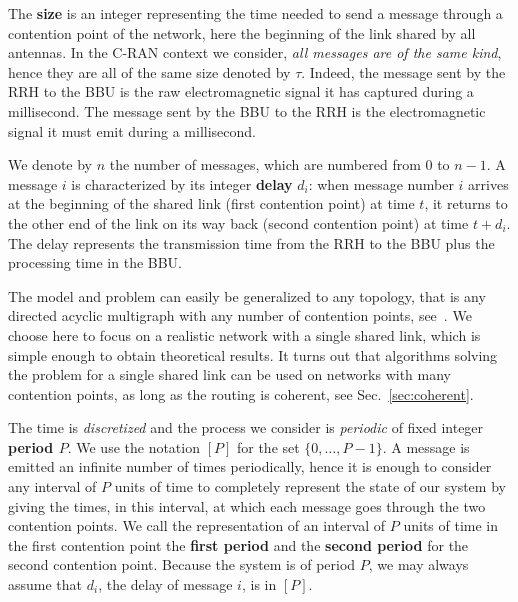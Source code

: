 \documentclass[pdflatex,sn-mathphys,iicol]{sn-jnl}%
\theoremstyle{thmstyleone}%
\theoremstyle{thmstyletwo}%
\theoremstyle{thmstylethree}%
\begin{document}
The \textbf{size} is an integer representing the time needed to send a message through a contention point of the network, here the beginning of the link shared by all antennas. In the C-RAN context we consider, \emph{all messages are of the same kind}, hence they are all of the same size denoted by $\tau$. Indeed, the message sent by the RRH to the BBU is the raw electromagnetic signal it has captured during a millisecond. The message sent by the BBU to the RRH is the electromagnetic signal it must emit during a millisecond.

 We denote by $n$ the number of messages, which are numbered from $0$ to $n-1$. A message $i$ is characterized by its integer \textbf{delay} $d_i$: when message number $i$ arrives at the beginning of the shared link (first contention point) at time $t$, it returns to the other end of the link on its way back (second contention point) at time $t + d_i$. The delay represents the transmission time from the RRH to the BBU plus the processing time in the BBU. 

  The model and problem can easily be generalized to any topology, that is any directed acyclic multigraph with any number of contention points, see~\cite{bartharxiv2018deterministic}. We choose here to focus on a realistic network with a single shared link, which is simple enough to obtain theoretical results. It turns out that algorithms solving the problem for a single shared link can be used on networks with many contention points, as long as the routing is coherent, see Sec.~\ref{sec:coherent}. 

The time is \emph{discretized} and the process we consider is \emph{periodic} of fixed integer \textbf{period $P$}. We use the notation $[P]$ for the set $\{0,\dots,P-1\}$. A message is emitted an infinite number of times periodically, hence it is enough to consider any interval of $P$ units of time to completely represent the state of our system by giving the times, in this interval, at which each message goes through the two contention points. We call the representation of an interval of $P$ units of time in the first contention point the \textbf{first period} and the \textbf{second period} for the second contention point. Because the system is of period $P$, we may always assume that $d_i$, the delay of message $i$, is in $[P]$. 
\end{document}
